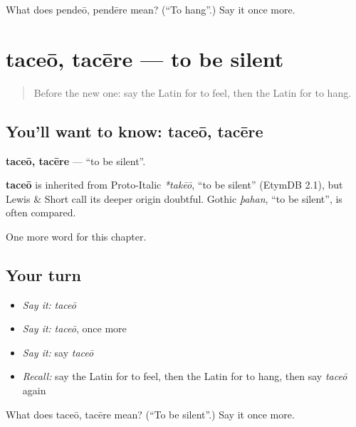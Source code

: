 \begin{tcolorbox}[breakable,colback=teal!4,colframe=teal!35!black,title={Before you move on}]
What does pendeō, pendēre mean? (\textquotedblleft{}To hang\textquotedblright{}.) Say it once more.
\end{tcolorbox}
\section[taceō, tacēre]{taceō, tacēre — to be silent}

\label{lesson:LA-C159-taceo}



\begin{quote}
Before the new one: say the Latin for to feel, then the Latin for to hang.
\end{quote}

\subsection*{You'll want to know: taceō, tacēre}
\textbf{taceō, tacēre} — \textquotedblleft{}to be silent\textquotedblright{}.

\begin{cousinweb}
\textbf{taceō} is inherited from Proto-Italic \emph{*takēō}, \textquotedblleft{}to be silent\textquotedblright{} (EtymDB 2.1), but Lewis \& Short call its deeper origin doubtful. Gothic \emph{þahan}, \textquotedblleft{}to be silent\textquotedblright{}, is often compared.
\end{cousinweb}

\begin{grammarlens}[title={What you've built}]
One more word for this chapter.
\end{grammarlens}

\subsection*{Your turn}
\begin{itemize}
\raggedright
  \item \emph{Say it:} \emph{taceō}
  \item \emph{Say it:} \emph{taceō}, once more
  \item \emph{Say it:} say \emph{taceō}
  \item \emph{Recall:} say the Latin for to feel, then the Latin for to hang, then say \emph{taceō} again
\end{itemize}

\begin{tcolorbox}[breakable,colback=teal!4,colframe=teal!35!black,title={Before you move on}]
What does taceō, tacēre mean? (\textquotedblleft{}To be silent\textquotedblright{}.) Say it once more.
\end{tcolorbox}
